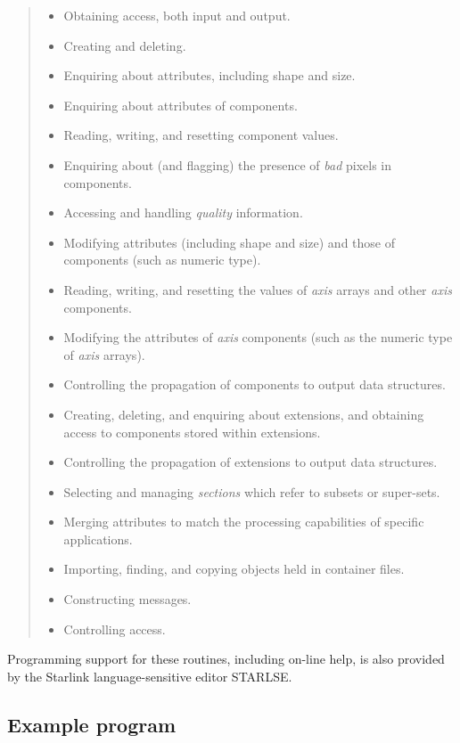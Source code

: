 \begin{small}
\begin{quote}
\begin{itemize}
\item Obtaining access, both input and output.
\item Creating and deleting.
\item Enquiring about attributes, including shape and size.
\item Enquiring about attributes of components. 
\item Reading, writing, and resetting component values.
\item Enquiring about (and flagging) the presence of {\em bad\/} pixels in
 components.
\item Accessing and handling {\em quality\/} information.
\item Modifying attributes (including shape and size) and those of components
 (such as numeric type). 
\item Reading, writing, and resetting the values of {\em axis\/} arrays and
 other {\em axis\/} components.
\item Modifying the attributes of {\em axis} components (such as the numeric
 type of {\em axis\/} arrays). 
\item Controlling the propagation of components to output data structures.
\item Creating, deleting, and enquiring about extensions, and obtaining
 access to components stored within extensions. 
\item Controlling the propagation of extensions to output data structures. 
\item Selecting and managing {\em sections\/} which refer to subsets or 
 super-sets.
\item Merging attributes to match the processing capabilities of specific
 applications.
\item Importing, finding, and copying objects held in container files.
\item Constructing messages.
\item Controlling access.
\end{itemize}
\end{quote}
\end{small}

Programming support for these routines, including on-line help, is also
provided by the Starlink language-sensitive editor STARLSE.

\subsection{Example program}
\label{S_addexample}

